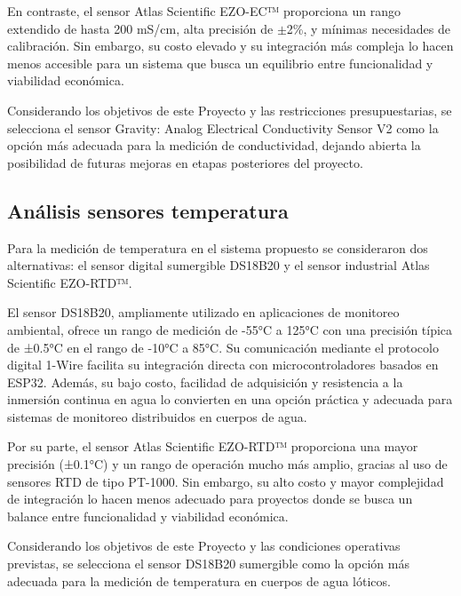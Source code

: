 En contraste, el sensor Atlas Scientific EZO-EC™ proporciona un rango extendido de hasta 200 mS/cm, alta precisión de $\pm$2\%, y mínimas necesidades de calibración. Sin embargo, su costo elevado y su integración más compleja lo hacen menos accesible para un sistema que busca un equilibrio entre funcionalidad y viabilidad económica.

Considerando los objetivos de este Proyecto y las restricciones presupuestarias, se selecciona el sensor Gravity: Analog Electrical Conductivity Sensor V2 como la opción más adecuada para la medición de conductividad, dejando abierta la posibilidad de futuras mejoras en etapas posteriores del proyecto.

\subsection{Análisis sensores temperatura}


Para la medición de temperatura en el sistema propuesto se consideraron dos alternativas: el sensor digital sumergible DS18B20 y el sensor industrial Atlas Scientific EZO-RTD™.

El sensor DS18B20, ampliamente utilizado en aplicaciones de monitoreo ambiental, ofrece un rango de medición de -55°C a 125°C con una precisión típica de ±0.5°C en el rango de -10°C a 85°C. Su comunicación mediante el protocolo digital 1-Wire facilita su integración directa con microcontroladores basados en ESP32. Además, su bajo costo, facilidad de adquisición y resistencia a la inmersión continua en agua lo convierten en una opción práctica y adecuada para sistemas de monitoreo distribuidos en cuerpos de agua.

Por su parte, el sensor Atlas Scientific EZO-RTD™ proporciona una mayor precisión (±0.1°C) y un rango de operación mucho más amplio, gracias al uso de sensores RTD de tipo PT-1000. Sin embargo, su alto costo y mayor complejidad de integración lo hacen menos adecuado para proyectos donde se busca un balance entre funcionalidad y viabilidad económica.

Considerando los objetivos de este Proyecto y las condiciones operativas previstas, se selecciona el sensor DS18B20 sumergible como la opción más adecuada para la medición de temperatura en cuerpos de agua lóticos.


